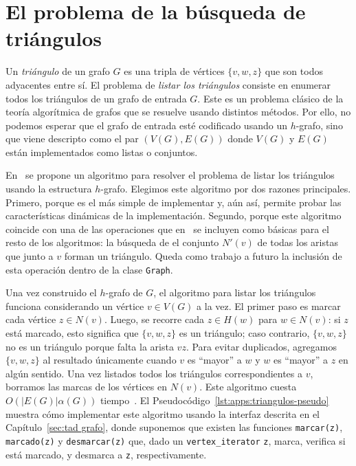 \documentclass[%
    a4paper,%
    fontsize=12pt,%
    DIV=12,
    twoside,%
    openright,%
    titlepage=true,%
    headsepline,%
    toc=bibliography,%
    parskip=half,%
    cleardoublepage=empty,%
    headings=big,%
]{scrbook}
\makeatletter
\newcommand{\Code}[2][]{\lstinline[basicstyle={\ttfamily},#1]@#2@}
\newcommand{\CPPCode}[2][]{\lstinline[language=C++,basicstyle={\ttfamily},#1]@#2@}
\makeatother
\begin{document}
\section{El problema de la búsqueda de triángulos}

Un \emph{triángulo} de un grafo $G$ es una tripla de vértices $\{v, w, z\}$ que son todos adyacentes entre sí.  El problema de \emph{listar los triángulos} consiste en enumerar todos los triángulos de un grafo de entrada $G$.  Este es un problema clásico de la teoría algorítmica de grafos que se resuelve usando distintos métodos.  Por ello, no podemos esperar que el grafo de entrada esté codificado usando un $h$-grafo, sino que viene descripto como el par $(V(G), E(G))$ donde $V(G)$ y $E(G)$ están implementados como listas o conjuntos.

En~\cite{LinSoulignacSzwarcfiterTCS2012} se propone un algoritmo para resolver el problema de listar los triángulos usando la estructura $h$-grafo.  Elegimos este algoritmo por dos razones principales.  Primero, porque es el más simple de implementar y, aún así, permite probar las características dinámicas de la implementación.  Segundo, porque este algoritmo coincide con una de las operaciones que en~\cite{LinSoulignacSzwarcfiterTCS2012} se incluyen como básicas para el resto de los algoritmos: la búsqueda de el conjunto $N'(v)$ de todas los aristas que junto a $v$ forman un triángulo.  Queda como trabajo a futuro la inclusión de esta operación dentro de la clase \CPPCode{Graph}.

Una vez construido el $h$-grafo de $G$, el algoritmo para listar los triángulos funciona considerando un vértice $v \in V(G)$ a la vez.  El primer paso es marcar cada vértice $z \in N(v)$.  Luego, se recorre cada $z \in H(w)$ para $w \in N(v)$: si $z$ está marcado, esto significa que $\{v,w,z\}$ es un triángulo; caso contrario, $\{v,w,z\}$ no es un triángulo porque falta la arista $vz$.  Para evitar duplicados, agregamos $\{v,w,z\}$ al resultado únicamente cuando $v$ es ``mayor'' a $w$ y $w$ es ``mayor'' a $z$ en algún sentido.  Una vez listados todos los triángulos correspondientes a $v$, borramos las marcas de los vértices en $N(v)$.  Este algoritmo cuesta $O(|E(G)|\alpha(G))$ tiempo~\cite{LinSoulignacSzwarcfiterTCS2012}.  El Pseudocódigo~\ref{lst:apps:triangulos-pseudo} muestra cómo implementar este algoritmo usando la interfaz descrita en el Capítulo~\ref{sec:tad grafo}, donde suponemos que existen las funciones \Code{marcar(z)}, \Code{marcado(z)} y \Code{desmarcar(z)} que, dado un \Code{vertex_iterator} \Code{z}, marca, verifica si está marcado, y desmarca a \Code{z}, respectivamente.
\end{document}
